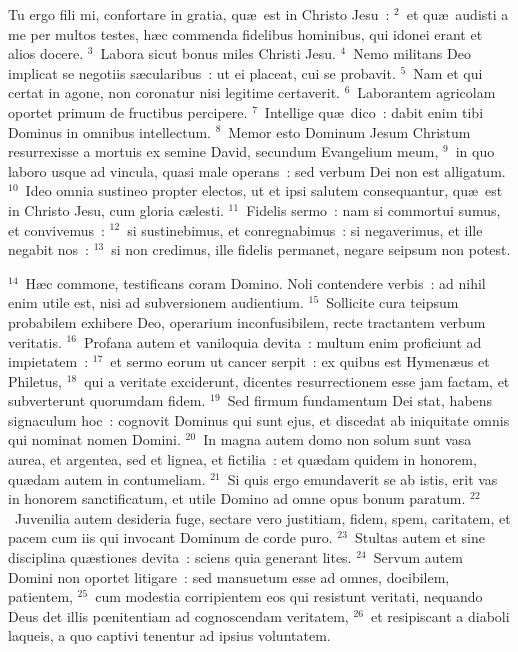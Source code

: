 \lettrine[lines=10,image=true,loversize=0.05,lraise=-0.03]{T}{}u ergo fili mi, confortare in gratia, qu\ae\ est in Christo Jesu~:
${}^{2}$~et qu\ae\ audisti a me per multos testes, h\ae c commenda fidelibus hominibus, qui idonei erant et alios docere.
${}^{3}$~Labora sicut bonus miles Christi Jesu.
${}^{4}$~Nemo militans Deo implicat se negotiis s\ae cularibus~: ut ei placeat, cui se probavit.
${}^{5}$~Nam et qui certat in agone, non coronatur nisi legitime certaverit.
${}^{6}$~Laborantem agricolam oportet primum de fructibus percipere.
${}^{7}$~Intellige qu\ae\ dico~: dabit enim tibi Dominus in omnibus intellectum.
${}^{8}$~Memor esto Dominum Jesum Christum resurrexisse a mortuis ex semine David, secundum Evangelium meum,
${}^{9}$~in quo laboro usque ad vincula, quasi male operans~: sed verbum Dei non est alligatum.
${}^{10}$~Ideo omnia sustineo propter electos, ut et ipsi salutem consequantur, qu\ae\ est in Christo Jesu, cum gloria c\ae lesti.
${}^{11}$~Fidelis sermo~: nam si commortui sumus, et convivemus~:
${}^{12}$~si sustinebimus, et conregnabimus~: si negaverimus, et ille negabit nos~:
${}^{13}$~si non credimus, ille fidelis permanet, negare seipsum non potest.


${}^{14}$~H\ae c commone, testificans coram Domino. Noli contendere verbis~: ad nihil enim utile est, nisi ad subversionem audientium.
${}^{15}$~Sollicite cura teipsum probabilem exhibere Deo, operarium inconfusibilem, recte tractantem verbum veritatis.
${}^{16}$~Profana autem et vaniloquia devita~: multum enim proficiunt ad impietatem~:
${}^{17}$~et sermo eorum ut cancer serpit~: ex quibus est Hymen\ae us et Philetus,
${}^{18}$~qui a veritate exciderunt, dicentes resurrectionem esse jam factam, et subverterunt quorumdam fidem.
${}^{19}$~Sed firmum fundamentum Dei stat, habens signaculum hoc~: cognovit Dominus qui sunt ejus, et discedat ab iniquitate omnis qui nominat nomen Domini.
${}^{20}$~In magna autem domo non solum sunt vasa aurea, et argentea, sed et lignea, et fictilia~: et qu\ae dam quidem in honorem, qu\ae dam autem in contumeliam.
${}^{21}$~Si quis ergo emundaverit se ab istis, erit vas in honorem sanctificatum, et utile Domino ad omne opus bonum paratum.
${}^{22}$~Juvenilia autem desideria fuge, sectare vero justitiam, fidem, spem, caritatem, et pacem cum iis qui invocant Dominum de corde puro.
${}^{23}$~Stultas autem et sine disciplina qu\ae stiones devita~: sciens quia generant lites.
${}^{24}$~Servum autem Domini non oportet litigare~: sed mansuetum esse ad omnes, docibilem, patientem,
${}^{25}$~cum modestia corripientem eos qui resistunt veritati, nequando Deus det illis pœnitentiam ad cognoscendam veritatem,
${}^{26}$~et resipiscant a diaboli laqueis, a quo captivi tenentur ad ipsius voluntatem.


